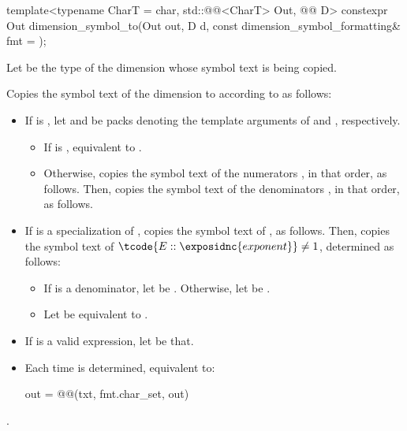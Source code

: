 \begin{itemdecl}
template<typename CharT = char, std::@@<CharT> Out, @@ D>
constexpr Out dimension_symbol_to(Out out, D d, const dimension_symbol_formatting& fmt = {});
\end{itemdecl}

\begin{itemdescr}
\pnum
Let  be the type of the dimension whose symbol text is being copied.

\pnum
\effects
Copies the symbol text of the dimension  to  according to  as follows:
\begin{itemize}
\item
If
is ,
let  and 
be packs denoting the template arguments of
 and , respectively.
\begin{itemize}
\item
If  is ,
equivalent to .
\item
Otherwise, copies the symbol text of the numerators , in that order, as follows.
Then, copies the symbol text of the denominators , in that order, as follows.
\end{itemize}
\item
If  is a specialization of ,
copies the symbol text of , as follows.
Then, copies the symbol text of $\tcode{E::\exposidnc{exponent}} \neq 1$, determined as follows:
\begin{itemize}
\item
If  is a denominator, let  be .
Otherwise, let  be .
\item
Let  be equivalent to .
\end{itemize}
\item
If  is a valid expression, let  be that.
\item
Each time  is determined, equivalent to:
\begin{codeblock}
out = @@(txt, fmt.char_set, out)
\end{codeblock}
\end{itemize}

\pnum
\returns
{}.
\end{itemdescr}


